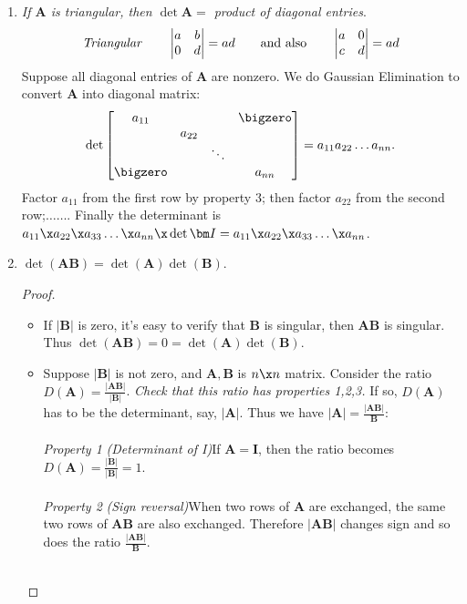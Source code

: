 \begin{enumerate}
\item
\emph{If $\bm A$ is triangular, then $\det\bm A=$ product of diagonal entries}.
\begin{gather*}
\text{\emph{Triangular}}\qquad\begin{vmatrix}a&b\\0&d\end{vmatrix}=ad\qquad\text{and also}\qquad\begin{vmatrix}a&0\\c&d\end{vmatrix}=ad
\end{gather*}
Suppose all diagonal entries of $\bm A$ are nonzero. We do Gaussian Elimination to convert $\bm A$ into diagonal matrix:
\[
\det\begin{bmatrix}
a_{11}&&&\bigzero\\&a_{22}&&\\&&\ddots&\\\bigzero&&&a_{nn}
\end{bmatrix}=a_{11}a_{22}\dots a_{nn}.
\]
Factor $a_{11}$ from the first row by property 3; then factor $a_{22}$ from the second row;$\dots\dots$. Finally the determinant is $a_{11}\x a_{22}\x a_{33}\dots\x a_{nn}\x\det\bm I=a_{11}\x a_{22}\x a_{33}\dots\x a_{nn}$.
\item 
$\det(\bm{AB})=\det(\bm A)\det(\bm B)$.
\begin{proof}\qquad\\
\begin{itemize}
\item
If $|\bm B|$ is zero, it's easy to verify that $\bm B$ is singular, then $\bm{AB}$ is singular. Thus $\det(\bm{AB})=0=\det(\bm A)\det(\bm B)$.
\item
Suppose $|\bm B|$ is not zero, and $\bm A,\bm B$ is $n\x n$ matrix. Consider the ratio $D(\bm A)=\frac{|\bm{AB}|}{|\bm B|}$. \textit{Check that this ratio has properties 1,2,3.} If so, $D(\bm A)$ has to be the determinant, say, $|\bm A|$. Thus we have $|\bm A|=\frac{|\bm{AB}|}{\bm B}$:\\\\
\emph{Property 1  }\textit{(Determinant of I)}\quad If $\bm A=\bm I$, then the ratio becomes $D(\bm A)=\frac{|\bm B|}{|\bm B|}=1.$\\\\
\emph{Property 2  }\textit{(Sign reversal)}\quad When two rows of $\bm A$ are exchanged, the same two rows of $\bm{AB}$ are also exchanged. Therefore $|\bm{AB}|$ changes sign and so does the ratio $\frac{|\bm{AB}|}{\bm B}$.\\\\

\end{itemize}
\end{proof}
\end{enumerate}
